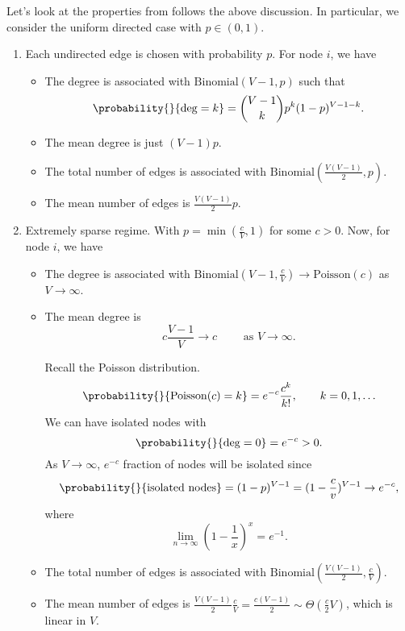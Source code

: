 Let's look at the properties from follows the above discussion. In particular, we consider the uniform directed case with \(p\in(0, 1)\).
\begin{enumerate}
	\item Each undirected edge is chosen with probability \(p\). For node \(i\), we have
	      \begin{itemize}
		      \item The degree is associated with
		            \(\mathrm{Binomial}(V-1, p)\) such that
		            \[
			            \probability{}{\deg = k} = \binom{V-1}{k}p^k (1 - p)^{V-1-k}.
		            \]
		      \item The mean degree is just \((V-1)p\).
		      \item The total number of edges is associated with \(\mathrm{Binomial}(\frac{V(V-1)}{2}, p)\).
		      \item The mean number of edges is \(\frac{V(V-1)}{2}p\).
	      \end{itemize}
	\item Extremely sparse regime. With \(p = \min(\frac{c}{V}, 1)\) for some \(c>0\). Now, for node \(i\), we have
	      \begin{itemize}
		      \item The degree is associated with \(\mathrm{Binomial}(V - 1, \frac{c}{V}) \to \mathrm{Poisson}(c) \) as \(V\to \infty \).
		      \item The mean degree is
		            \[
			            c \frac{V-1}{V}\to c\qquad \text{ as }V\to \infty.
		            \]
		            \begin{note}
			            Recall the Poisson distribution.
			            \[
				            \probability{}{ \mathrm{Poisson}(c)=k } = e^{-c} \frac{c^k}{k!}, \qquad k = 0, 1, \ldots
			            \]
			            We can have isolated nodes with
			            \[
				            \probability{}{ \deg=0} = e^{-c} > 0.
			            \]
			            As \(V\to \infty \), \(e^{-c}\) fraction of nodes will be isolated since
			            \[
				            \probability{}{ \text{isolated nodes}} = (1 - p)^{V - 1} = (1 - \frac{c}{v})^{V-1} \to e^{-c},
			            \]
			            where
			            \[
				            \lim_{n \to \infty} (1 - \frac{1}{x})^x = e^{-1}.
			            \]
		            \end{note}
		      \item The total number of edges is associated with \(\mathrm{Binomial}(\frac{V(V-1)}{2}, \frac{c}{V})\).
		      \item The mean number of edges is \(\frac{V(V - 1)}{2}\frac{c}{V} = \frac{c(V - 1)}{2}\sim \Theta(\frac{c}{2}V)\), which is linear in \(V\).
	      \end{itemize}


\end{enumerate}
